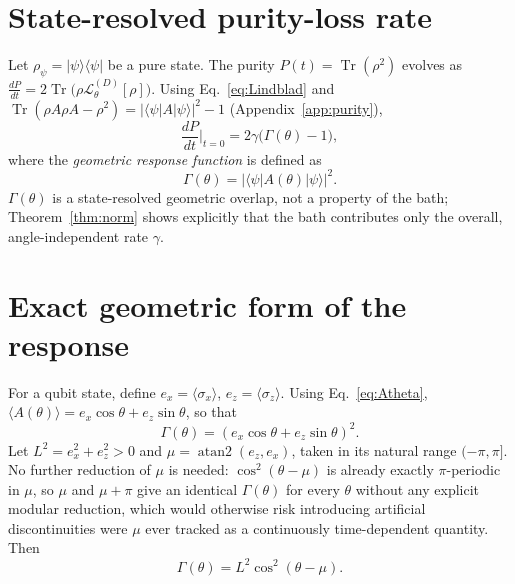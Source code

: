 \documentclass[aps,pra,reprint,superscriptaddress,nofootinbib,longbibliography]{revtex4-2}
\newcommand{\tr}{\operatorname{Tr}}
\begin{document}
\section{State-resolved purity-loss rate}
\label{sec:purity}

Let $\rho_\psi=|\psi\rangle\langle\psi|$ be a pure state. The purity
$P(t)=\tr(\rho^2)$ evolves as
$\frac{dP}{dt} = 2\tr\bigl(\rho\mathcal{L}^{(D)}_\theta[\rho]\bigr)$.
Using Eq.~\eqref{eq:Lindblad} and $\tr(\rho A\rho A-\rho^2)
=|\langle\psi|A|\psi\rangle|^2-1$ (Appendix~\ref{app:purity}),
\begin{equation}
\boxed{\frac{dP}{dt}\Big|_{t=0} = 2\gamma\bigl(\Gamma(\theta)-1\bigr)},
\label{eq:pureloss}
\end{equation}
where the \emph{geometric response function} is defined as
\begin{equation}
\boxed{\Gamma(\theta) = |\langle\psi|A(\theta)|\psi\rangle|^2}.
\label{eq:GammaDef}
\end{equation}
$\Gamma(\theta)$ is a state-resolved geometric overlap, not a
property of the bath; Theorem~\ref{thm:norm} shows explicitly that the
bath contributes only the overall, angle-independent rate $\gamma$.

\section{Exact geometric form of the response}
\label{sec:response}

For a qubit state, define $e_x=\langle\sigma_x\rangle$,
$e_z=\langle\sigma_z\rangle$. Using Eq.~\eqref{eq:Atheta},
$\langle A(\theta)\rangle = e_x\cos\theta + e_z\sin\theta$, so that
\begin{equation}
\boxed{\Gamma(\theta) = (e_x\cos\theta + e_z\sin\theta)^2}.
\label{eq:GammaExact}
\end{equation}
Let $L^2 = e_x^2+e_z^2 > 0$ and $\mu = \operatorname{atan2}(e_z,e_x)$,
taken in its natural range $(-\pi,\pi]$. No further reduction of $\mu$
is needed: $\cos^2(\theta-\mu)$ is already exactly $\pi$-periodic in
$\mu$, so $\mu$ and $\mu+\pi$ give an identical $\Gamma(\theta)$ for
every $\theta$ without any explicit modular reduction, which would
otherwise risk introducing artificial discontinuities were $\mu$ ever
tracked as a continuously time-dependent quantity. Then
\begin{equation}
\boxed{\Gamma(\theta) = L^2\cos^2(\theta-\mu)}.
\label{eq:Gammacos}
\end{equation}
\end{document}
